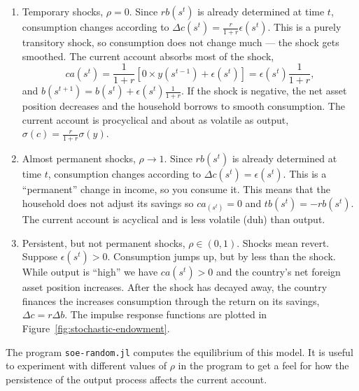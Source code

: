 \documentclass[11pt,pdftex,twoside,letterpaper]{exam}
\begin{document}
\begin{enumerate}
  \item Temporary shocks, $\rho=0$. Since $rb(s^t)$ is already determined at time $t$, consumption changes according to $\Delta c(s^t) = \frac{r}{1+r}\epsilon(s^t)$. This is a purely transitory shock, so consumption does not change much --- the shock gets smoothed. The current account absorbs most of the shock,
      \begin{equation}
        ca(s^t)=\frac{1}{1+r}[0\times y(s^{t-1})+\epsilon(s^t)]=\epsilon(s^t)\frac{1}{1+r},
      \end{equation} and $b(s^{t+1}) = b(s^t) + \epsilon(s^t)\frac{1}{1+r}$. If the shock is negative, the net asset position decreases and the household borrows to smooth consumption. The current account is procyclical and about as volatile as output, $\sigma(c)=\frac{r}{1+r}\sigma(y)$.
      \item Almost permanent shocks, $\rho \rightarrow 1$. Since $rb(s^t)$ is already determined at time $t$, consumption changes according to $\Delta c(s^t) = \epsilon(s^t)$. This is a ``permanent'' change in income, so you consume it. This means that the household does not adjust its savings so $ca_(s^t)=0$ and $tb(s^t)=-rb(s^t)$. The current account is acyclical and is less volatile (duh) than output.
      \item Persistent, but not permanent shocks, $\rho\in(0,1)$. Shocks mean revert. Suppose $\epsilon(s^t)>0$. Consumption jumps up, but by less than the shock. While output is ``high'' we have $ca(s^t)>0$ and the country's net foreign asset position increases. After the shock has decayed away, the country finances the increases consumption through the return on its savings, $\Delta c = r \Delta b$. The impulse response functions are plotted in Figure~\ref{fig:stochastic-endowment}.
\end{enumerate}
The program \texttt{soe-random.jl} computes the equilibrium of this model. It is useful to experiment with different values of $\rho$ in the program to get a feel for how the persistence of the output process affects the current account.
\end{document}
